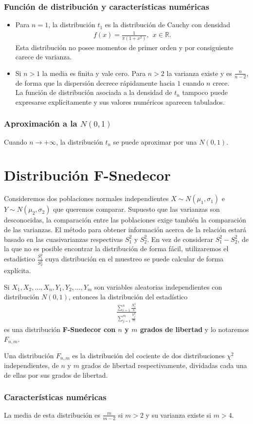 \subsubsection{Función de distribución y características numéricas}

\begin{itemize}
    \item Para $n = 1$, la distribución $t_1$ es la distribución de Cauchy con densidad
    \begin{align*}
        f(x) = \frac{1}{\pi (1 + x^2)}, \ \ x \in \mathbb{R}.
    \end{align*}
    Esta distribución no posee momentos de primer orden y por consiguiente carece de varianza.
    \item Si $n > 1$ la media es finita y vale cero. Para $n > 2$ la varianza existe y es $\frac{n}{n-2}$, de forma que la dispersión decrece rápidamente hacia $1$ cuando $n$ crece.
    \\
    \newline
    La función de distribución asociada a la densidad de $t_n$ tampoco puede expresarse explícitamente y sus valores numéricos aparecen tabulados.
\end{itemize}

\subsubsection{Aproximación a la $N(0,1)$}
Cuando $n \to +\infty$, la distribución $t_n$ se puede aproximar por una $N(0,1)$.
\section{Distribución F-Snedecor}
Consideremos dos poblaciones normales independientes $X \sim N(\mu_1,\sigma_1)$ e $Y \sim N(\mu_2,\sigma_2)$ que queremos comparar. Supuesto que las varianzas son desconocidas, la comparación entre las poblaciones exige también la comparación de las varianzas. El método para obtener información acerca de la relación estará basado en las cuasivarianzas respectivas $S_1^2$ y $S_2^2$. En vez de considerar $S_1^2 - S_2^2$, de la que no es posible encontrar la distribución de forma fácil, utilizaremos el estadístico $\frac{S_1^2}{S_2^2}$ cuya distribución en el muestreo se puede calcular de forma explícita.

\begin{defi}
Si $X_1,X_2,...,X_n,Y_1,Y_2,...,Y_m$ son variables aleatorias independientes con distribución $N(0,1)$, entonces la distribución del estadístico
\begin{align*}
    \frac{\sum_{i=1}^{n}{\frac{X_i^2}{n}}}{\sum_{j=1}^{m}{\frac{Y_j^2}{m}}}
\end{align*}
es una distribución \textbf{F-Snedecor con $n$ y $m$ grados de libertad} y lo notaremos $F_{n,m}$.
\end{defi}
Una distribución $F_{n,m}$ es la distribución del cociente de dos distribuciones $\chi^2$ independientes, de $n$ y $m$ grados de libertad respectivamente, dividadas cada una de ellas por sus grados de libertad.

\subsubsection{Características numéricas}
La media de esta distribución es $\frac{m}{m-2}$ si $m > 2$ y su varianza existe si $m > 4$.